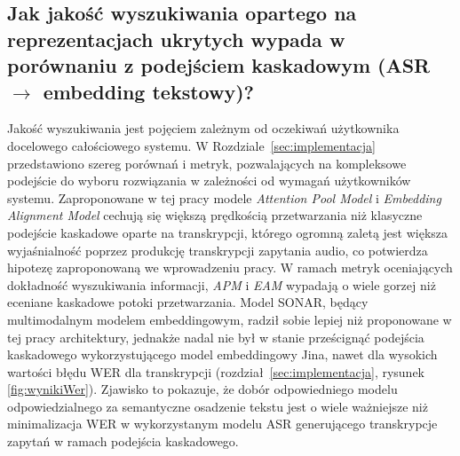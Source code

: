 \subsection{Jak jakość wyszukiwania opartego na reprezentacjach ukrytych wypada w porównaniu z podejściem kaskadowym (ASR $\rightarrow$ embedding tekstowy)?}
Jakość wyszukiwania jest pojęciem zależnym od oczekiwań użytkownika docelowego całościowego systemu. W Rozdziale~\ref{sec:implementacja} przedstawiono szereg porównań i metryk, pozwalających na kompleksowe podejście do wyboru rozwiązania w zależności od wymagań użytkowników systemu. Zaproponowane w tej pracy modele \textit{Attention Pool Model} i \textit{Embedding Alignment Model} cechują się większą prędkością przetwarzania niż klasyczne podejście kaskadowe oparte na transkrypcji, którego ogromną zaletą jest większa wyjaśnialność poprzez produkcję transkrypcji zapytania audio, co potwierdza hipotezę zaproponowaną we wprowadzeniu pracy. W ramach metryk oceniających dokładność wyszukiwania informacji, \textit{APM} i \textit{EAM} wypadają o wiele gorzej niż eceniane kaskadowe potoki przetwarzania. Model SONAR, będący multimodalnym modelem embeddingowym, radził sobie lepiej niż proponowane w tej pracy architektury, jednakże nadal nie był w stanie prześcignąć podejścia kaskadowego wykorzystującego model embeddingowy Jina, nawet dla wysokich wartości błędu WER dla transkrypcji (rozdział~\ref{sec:implementacja}, rysunek \ref{fig:wynikiWer}). Zjawisko to pokazuje, że dobór odpowiedniego modelu odpowiedzialnego za semantyczne osadzenie tekstu jest o wiele ważniejsze niż minimalizacja WER w wykorzystanym modelu ASR generującego transkrypcje zapytań w ramach podejścia kaskadowego.
